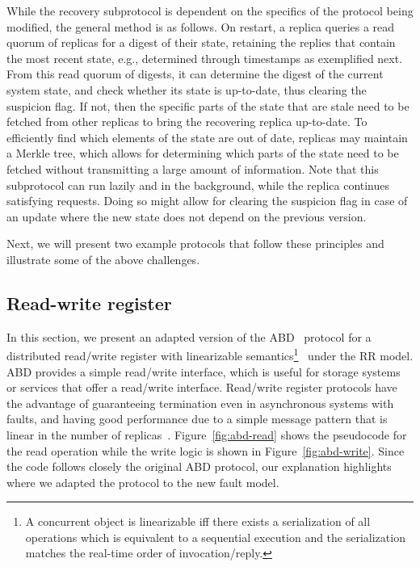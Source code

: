 While the recovery subprotocol is dependent on the specifics of
the protocol being modified, the general method is as follows. On
restart, a replica queries a read quorum of replicas for a digest
of their state, retaining the replies that contain the most
recent state, e.g., determined through timestamps as exemplified
next.  From this read quorum of digests, it can determine the
digest of the current system state, and check whether its state
is up-to-date, thus clearing the suspicion flag. If not, then the
specific parts of the state that are stale need to be fetched
from other replicas to bring the recovering replica up-to-date.
To efficiently find which elements of the state are out of date,
replicas may maintain a Merkle tree, which allows for determining
which parts of the state need to be fetched without transmitting
a large amount of information. Note that this subprotocol can run
lazily and in the background, while the replica continues
satisfying requests. Doing so might allow for clearing the
suspicion flag in case of an update where the new state does not
depend on the previous version.


Next, we will present two example protocols that follow these
principles and illustrate some of the above challenges.

\subsection{Read-write register}\label{ssec:abd}

In this section, we present an adapted version of the
ABD~\cite{abd} protocol for a distributed read/write register
with linearizable semantics\footnote{A concurrent object is
linearizable iff there exists a serialization of all operations
which is equivalent to a sequential execution and the
serialization matches the real-time order of
invocation/reply.}~\cite{linearizability} under the \ac{RR}
model. ABD provides a simple read/write interface, which is
useful for storage systems or services that offer a read/write
interface. Read/write register protocols have the advantage of
guaranteeing termination even in asynchronous systems with
faults, and having good performance due to a simple message
pattern that is linear in the number of
replicas~\cite{gryff:nsdi20}.
%
Figure~\ref{fig:abd-read} shows the pseudocode for the read operation
while the write logic is shown in Figure~\ref{fig:abd-write}. Since
the code follows closely the original ABD protocol, our
explanation highlights where we adapted the protocol to the
new fault model.


